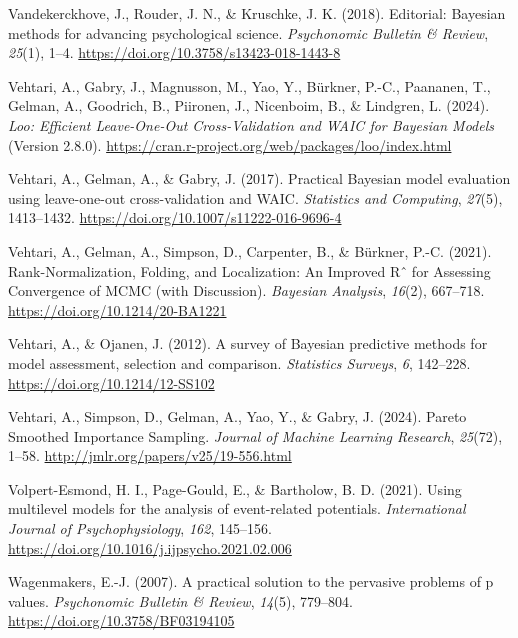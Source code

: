 \documentclass[
  doc,12pt,floatsintext]{apa7}
\newlength{\cslhangindent}
\newenvironment{CSLReferences}[2] %
 {\begin{list}{}{%
  \setlength{\itemindent}{0pt}
  \setlength{\leftmargin}{0pt}
  \setlength{\parsep}{0pt}
  \ifodd #1
   \setlength{\leftmargin}{\cslhangindent}
   \setlength{\itemindent}{-1\cslhangindent}
  \fi
  \setlength{\itemsep}{#2\baselineskip}}}
 {\end{list}}
\begin{document}
\begin{CSLReferences}{1}{0}
Vandekerckhove, J., Rouder, J. N., \& Kruschke, J. K. (2018). Editorial: {Bayesian} methods for advancing psychological science. \emph{Psychonomic Bulletin \& Review}, \emph{25}(1), 1--4. \url{https://doi.org/10.3758/s13423-018-1443-8}

Vehtari, A., Gabry, J., Magnusson, M., Yao, Y., Bürkner, P.-C., Paananen, T., Gelman, A., Goodrich, B., Piironen, J., Nicenboim, B., \& Lindgren, L. (2024). \emph{Loo: {Efficient Leave-One-Out Cross-Validation} and {WAIC} for {Bayesian Models}} (Version 2.8.0). \url{https://cran.r-project.org/web/packages/loo/index.html}

Vehtari, A., Gelman, A., \& Gabry, J. (2017). Practical {Bayesian} model evaluation using leave-one-out cross-validation and {WAIC}. \emph{Statistics and Computing}, \emph{27}(5), 1413--1432. \url{https://doi.org/10.1007/s11222-016-9696-4}

Vehtari, A., Gelman, A., Simpson, D., Carpenter, B., \& Bürkner, P.-C. (2021). Rank-{Normalization}, {Folding}, and {Localization}: {An Improved Rˆ} for {Assessing Convergence} of {MCMC} (with {Discussion}). \emph{Bayesian Analysis}, \emph{16}(2), 667--718. \url{https://doi.org/10.1214/20-BA1221}

Vehtari, A., \& Ojanen, J. (2012). A survey of {Bayesian} predictive methods for model assessment, selection and comparison. \emph{Statistics Surveys}, \emph{6}, 142--228. \url{https://doi.org/10.1214/12-SS102}

Vehtari, A., Simpson, D., Gelman, A., Yao, Y., \& Gabry, J. (2024). Pareto {Smoothed Importance Sampling}. \emph{Journal of Machine Learning Research}, \emph{25}(72), 1--58. \url{http://jmlr.org/papers/v25/19-556.html}

Volpert-Esmond, H. I., Page-Gould, E., \& Bartholow, B. D. (2021). Using multilevel models for the analysis of event-related potentials. \emph{International Journal of Psychophysiology}, \emph{162}, 145--156. \url{https://doi.org/10.1016/j.ijpsycho.2021.02.006}

Wagenmakers, E.-J. (2007). A practical solution to the pervasive problems of p values. \emph{Psychonomic Bulletin \& Review}, \emph{14}(5), 779--804. \url{https://doi.org/10.3758/BF03194105}


\end{CSLReferences}
\end{document}
